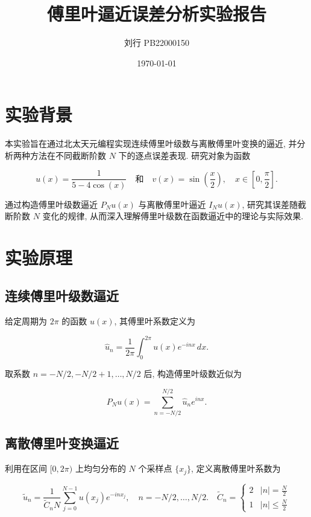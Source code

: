\documentclass{article}
\title{傅里叶逼近误差分析实验报告}
\author{刘行 PB22000150}
\date{\today}
\begin{document}
\maketitle

	\section{实验背景}
		本实验旨在通过北太天元编程实现连续傅里叶级数与离散傅里叶变换的逼近, 并分析两种方法在不同截断阶数 $N$ 下的逐点误差表现. 研究对象为函数

		\begin{equation*}
			u(x)=\frac{1}{5-4\cos(x)} \quad \text{和} \quad v(x)=\sin\left(\frac{x}{2}\right), \quad x\in \left[0,\frac{\pi}{2}\right].
		\end{equation*}

		通过构造傅里叶级数逼近 $P_N u(x)$ 与离散傅里叶逼近 $I_N u(x)$, 研究其误差随截断阶数 $N$ 变化的规律, 从而深入理解傅里叶级数在函数逼近中的理论与实际效果.

	\section{实验原理}
		\subsection{连续傅里叶级数逼近}
			给定周期为 $2\pi$ 的函数 $u(x)$, 其傅里叶系数定义为

			\begin{equation*}
				\hat{u}_n = \frac{1}{2\pi}\int_{0}^{2\pi} u(x)e^{-inx}\,dx.
			\end{equation*}

			取系数 $n=-N/2, -N/2+1, \dots, N/2$ 后, 构造傅里叶级数近似为

			\begin{equation*}
				P_N u(x)=\sum_{n=-N/2}^{N/2}\hat{u}_n e^{inx}.
			\end{equation*}

		\subsection{离散傅里叶变换逼近}
			利用在区间 $[0,2\pi)$ 上均匀分布的 $N$ 个采样点 $\{x_j\}$, 定义离散傅里叶系数为

			\begin{equation*}
				\tilde{u}_n=\frac{1}{\tilde{C}_nN}\sum_{j=0}^{N-1} u(x_j)e^{-inx_j}, \quad n=-N/2,\dots,N/2. \quad
				\tilde{C}_n = \left\{
				\begin{array}{lr}
					2 & \left\lvert n \right\rvert = \frac{N}{2} \\
					1 & \left\lvert n \right\rvert \leq \frac{N}{2}
				\end{array}\right.
			\end{equation*}
\end{document}
